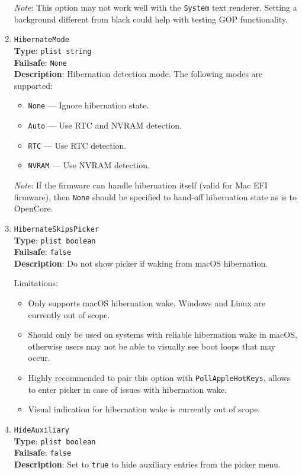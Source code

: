 \documentclass[]{article}
\providecommand{\tightlist}{%
  \setlength{\itemsep}{0pt}\setlength{\parskip}{0pt}}
\begin{document}
\begin{enumerate}
  \emph{Note}: This option may not work well with the \texttt{System} text renderer.
  Setting a background different from black could help with testing GOP functionality.

\item
  \texttt{HibernateMode}\\
  \textbf{Type}: \texttt{plist\ string}\\
  \textbf{Failsafe}: \texttt{None}\\
  \textbf{Description}: Hibernation detection mode. The following modes are supported:

  \begin{itemize}
  \tightlist
    \item \texttt{None} --- Ignore hibernation state.
    \item \texttt{Auto} --- Use RTC and NVRAM detection.
    \item \texttt{RTC} --- Use RTC detection.
    \item \texttt{NVRAM} --- Use NVRAM detection.
  \end{itemize}

  \emph{Note}: If the firmware can handle hibernation itself (valid for Mac EFI firmware),
  then \texttt{None} should be specified to hand-off hibernation state as is to OpenCore.

\item
  \texttt{HibernateSkipsPicker}\\
  \textbf{Type}: \texttt{plist\ boolean}\\
  \textbf{Failsafe}: \texttt{false}\\
  \textbf{Description}: Do not show picker if waking from macOS hibernation.

  Limitations:
  \begin{itemize}
   \item Only supports macOS hibernation wake, Windows and Linux are currently out of scope.
   \item Should only be used on systems with reliable hibernation wake in macOS, otherwise users may not
   be able to visually see boot loops that may occur.
  \item Highly recommended to pair this option with \texttt{PollAppleHotKeys}, allows to enter picker in
  case of issues with hibernation wake.
  \item Visual indication for hibernation wake is currently out of scope.
  \end{itemize}

\item
  \texttt{HideAuxiliary}\\
  \textbf{Type}: \texttt{plist\ boolean}\\
  \textbf{Failsafe}: \texttt{false}\\
  \textbf{Description}: Set to \texttt{true} to hide auxiliary entries from the picker menu.


\end{enumerate}
\end{document}
